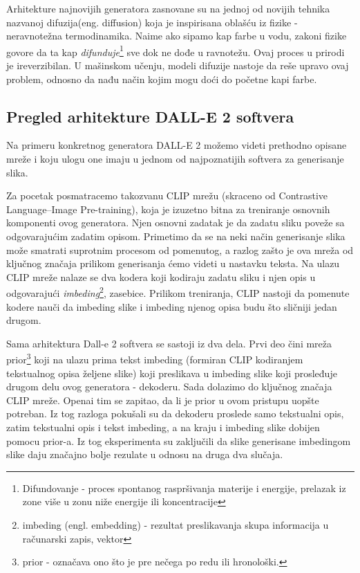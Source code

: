 \documentclass[12pt, letterpaper]{article}
\begin{document}
Arhitekture najnovijih generatora zasnovane su na jednoj od novijih tehnika nazvanoj difuzija(eng. diffusion) koja je inspirisana oblašću iz fizike - neravnotežna termodinamika. Naime ako sipamo kap farbe u vodu, zakoni fizike govore da ta kap \textit{difunduje}\footnote{Difundovanje - proces spontanog raspršivanja materije i energije, prelazak iz zone više u zonu niže energije ili koncentracije} sve dok ne dođe u ravnotežu. Ovaj proces u prirodi je ireverzibilan. U mašinskom učenju, modeli difuzije nastoje da reše upravo ovaj problem, odnosno da nađu način kojim mogu doći do početne kapi farbe.\cite{asembli}

\subsection{Pregled arhitekture DALL-E 2 softvera}

Na primeru konkretnog generatora DALL-E 2 možemo videti prethodno opisane mreže i koju ulogu one imaju u jednom od najpoznatijih softvera za generisanje slika.

Za pocetak posmatracemo takozvanu CLIP mrežu (skraceno od Contrastive Language–Image Pre-training), koja je izuzetno bitna za treniranje osnovnih komponenti ovog generatora. Njen osnovni zadatak je da zadatu sliku poveže sa odgovarajućim zadatim opisom. Primetimo da se na neki način generisanje slika može smatrati suprotnim procesom od pomenutog, a razlog zašto je ova mreža od ključnog značaja prilikom generisanja ćemo videti u nastavku teksta. Na ulazu CLIP mreže nalaze se dva kodera koji kodiraju zadatu sliku i njen opis u odgovarajući \textit{imbeding}\footnote{imbeding (engl. embedding) - rezultat preslikavanja skupa informacija u računarski zapis, vektor}, zasebice. Prilikom treniranja, CLIP nastoji da pomenute kodere nauči da imbeding slike i imbeding njenog opisa budu što sličniji jedan drugom.\cite{clip, openai_dali}

Sama arhitektura Dall-e 2 softvera se sastoji iz dva dela. Prvi deo čini mreža prior\footnote{prior - označava ono što je pre nečega po redu ili hronološki.} koji na ulazu prima tekst imbeding (formiran CLIP kodiranjem tekstualnog opisa željene slike) koji preslikava u imbeding slike koji prosleđuje drugom delu ovog generatora - dekoderu. Sada dolazimo do ključnog značaja CLIP mreže. Openai tim se zapitao, da li je prior u ovom pristupu uopšte potreban. Iz tog razloga pokušali su da dekoderu proslede samo tekstualni opis, zatim tekstualni opis i tekst imbeding, a na kraju i imbeding slike dobijen pomocu prior-a. Iz tog eksperimenta su zaključili da slike generisane imbedingom slike daju značajno bolje rezulate u odnosu na druga dva slučaja.\cite{openai_dali}
\end{document}
